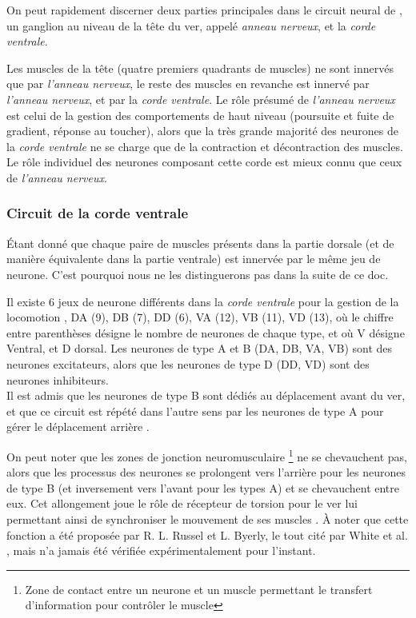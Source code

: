 On peut rapidement discerner deux parties principales dans le circuit neural de
\celeg{}, un ganglion au niveau de la tête du ver, appelé \textit{anneau
nerveux}, et la \textit{corde ventrale}.

Les muscles de la tête (quatre premiers quadrants de muscles) ne sont innervés que
par \textit{l'anneau nerveux}, le reste des muscles en revanche est innervé
par \textit{l'anneau nerveux}, et par la \textit{corde ventrale}.  Le rôle
présumé de \textit{l'anneau nerveux} est celui de la gestion des comportements
de haut niveau (poursuite et fuite de gradient, réponse au toucher), alors que la
très grande majorité des neurones de la \textit{corde ventrale} ne se charge que
de la contraction et décontraction des muscles. Le rôle individuel des neurones
composant cette corde est mieux connu que ceux de \textit{l'anneau nerveux}.


\subsubsection{Circuit de la corde ventrale} %
\label{ssub:Circuit de la corde ventrale}

Étant donné que chaque paire de muscles présents dans la partie dorsale (et de
manière équivalente dans la partie ventrale) est innervée par le même jeu de
neurone. C'est pourquoi nous ne les distinguerons pas dans la suite de ce doc.

Il existe 6 jeux de neurone différents dans la \textit{corde ventrale} pour la
gestion de la locomotion \cite{Boyle2009}, DA (9), DB (7), DD (6), VA (12), VB
(11), VD (13), où le chiffre entre parenthèses désigne le nombre de neurones de
chaque type, et où V désigne Ventral, et D dorsal.  Les neurones de type A et B
(DA, DB, VA, VB) sont des neurones excitateurs, alors que les neurones de type D
(DD, VD) sont des neurones inhibiteurs.\\


Il est admis que les neurones de type B sont dédiés au déplacement avant du ver,
et que ce circuit est répété dans l'autre sens par les neurones de type A
pour gérer le déplacement arrière \cite{AltunZ.F.andHall2011,Boyle2009,White1986}.

On peut noter que les zones de jonction neuromusculaire \footnote{Zone de
contact entre un neurone et un muscle permettant le transfert d'information 
pour contrôler le muscle} ne se chevauchent pas, alors que les processus
des neurones se prolongent vers l'arrière pour les neurones de type B (et
inversement vers l'avant pour les types A) et se chevauchent entre eux. Cet
allongement joue le rôle de récepteur de torsion pour le ver lui permettant
ainsi de synchroniser le mouvement de ses muscles \cite{Boyle2009}. À noter que
cette fonction a été proposée par R. L. Russel et L. Byerly, le tout cité par
White et al. \cite{White1986}, mais n'a jamais été vérifiée expérimentalement
pour l'instant.


